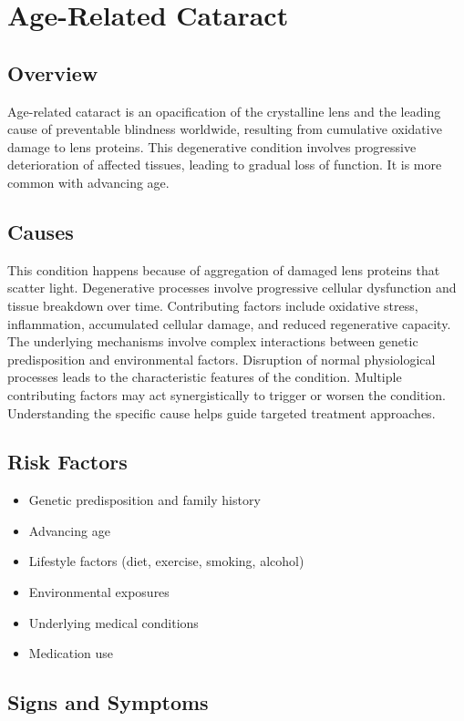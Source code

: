 \chapter{Age-Related Cataract}
\label{sec:Age-Related Cataract}

\section{Overview}
Age-related cataract is an opacification of the crystalline lens and the leading cause of preventable blindness worldwide, resulting from cumulative oxidative damage to lens proteins. This degenerative condition involves progressive deterioration of affected tissues, leading to gradual loss of function. It is more common with advancing age.
\section{Causes}
This condition happens because of aggregation of damaged lens proteins that scatter light. Degenerative processes involve progressive cellular dysfunction and tissue breakdown over time. Contributing factors include oxidative stress, inflammation, accumulated cellular damage, and reduced regenerative capacity. The underlying mechanisms involve complex interactions between genetic predisposition and environmental factors. Disruption of normal physiological processes leads to the characteristic features of the condition. Multiple contributing factors may act synergistically to trigger or worsen the condition. Understanding the specific cause helps guide targeted treatment approaches.
\section{Risk Factors}


\begin{itemize}[noitemsep]
  \item Genetic predisposition and family history
  \item Advancing age
  \item Lifestyle factors (diet, exercise, smoking, alcohol)
  \item Environmental exposures
  \item Underlying medical conditions
  \item Medication use
\end{itemize}
\section{Signs and Symptoms}

